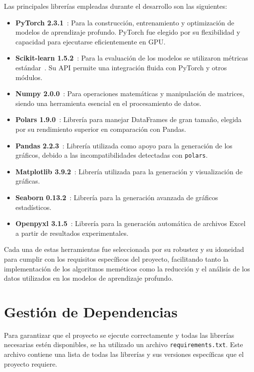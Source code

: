 Las principales librerías empleadas durante el desarrollo son las siguientes:
\begin{itemize}
      \item \textbf{PyTorch 2.3.1}~\cite{ketkarIntroductionPyTorch2021, TorchcudaPyTorch24}: Para la construcción,
            entrenamiento y optimización de modelos de aprendizaje profundo.
            PyTorch fue elegido por su flexibilidad y capacidad para ejecutarse eficientemente en GPU\@.
      \item \textbf{Scikit-learn 1.5.2}~\cite{vanderplasPythonDataScience2016}: Para la evaluación de los modelos se utilizaron
            métricas estándar~\cite{kramerScikitLearn2016}.
            Su API permite una integración fluida con PyTorch y otros módulos.
      \item \textbf{Numpy 2.0.0}~\cite{NumPyV20Manual}: Para operaciones matemáticas y manipulación de matrices,
            siendo una herramienta esencial en el procesamiento de datos.
      \item \textbf{Polars 1.9.0}~\cite{PolarsPythonAPI}: Librería para manejar DataFrames de gran tamaño,
            elegida por su rendimiento superior en comparación con Pandas.
      \item \textbf{Pandas 2.2.3}~\cite{Pandas223Documentation}: Librería utilizada como apoyo para la generación de los gráficos,
            debido a las incompatibilidades detectadas con \texttt{polars}.
      \item \textbf{Matplotlib 3.9.2}~\cite{Matplotlib393Documentation}: Librería utilizada para la generación y
            visualización de gráficas.
      \item \textbf{Seaborn 0.13.2}~\cite{Seaborn0132Documentation}: Librería para la generación avanzada de gráficos estadísticos.
      \item \textbf{Openpyxl 3.1.5}~\cite{Openpyxl313Documentation}: Librería para la generación automática de archivos Excel a partir de resultados experimentales.
\end{itemize}

Cada una de estas herramientas fue seleccionada por su robustez y su idoneidad para cumplir con los requisitos
específicos del proyecto, facilitando tanto la implementación de los algoritmos meméticos como la reducción y el
análisis de los datos utilizados en los modelos de aprendizaje profundo.


\section{Gestión de Dependencias}\label{sec:gestion-de-dependencias}
Para garantizar que el proyecto se ejecute correctamente y todas las librerías necesarias estén disponibles,
se ha utilizado un archivo \texttt{requirements.txt}.
Este archivo contiene una lista de todas las librerías y sus versiones específicas que el proyecto requiere.


